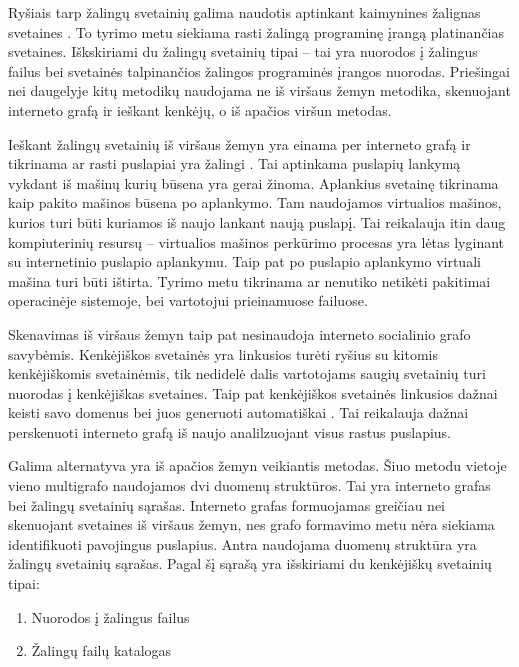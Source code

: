 
Ryšiais tarp žalingų svetainių galima naudotis aptinkant kaimynines žalignas svetaines \cite{webcop}.
To tyrimo metu siekiama rasti žalingą programinę įrangą platinančias svetaines. Iškskiriami du žalingų svetainių tipai --
tai yra nuorodos į žalingus failus bei svetainės talpinančios žalingos programinės įrangos nuorodas.
Priešingai nei daugelyje kitų metodikų naudojama ne iš viršaus žemyn metodika, skenuojant interneto grafą ir ieškant kenkėjų,
o iš apačios viršun metodas.

Ieškant žalingų svetainių iš viršaus žemyn yra einama per interneto grafą ir tikrinama ar rasti puslapiai yra žalingi \cite{webcop}.
Tai aptinkama puslapių lankymą vykdant iš mašinų kurių būsena yra gerai žinoma. Aplankius svetainę tikrinama kaip pakito
mašinos būsena po aplankymo. Tam naudojamos virtualios mašinos, kurios turi būti kuriamos iš naujo lankant naują puslapį.
Tai reikalauja itin daug kompiuterinių resursų -- virtualios mašinos perkūrimo procesas yra lėtas lyginant su
internetinio puslapio aplankymu. Taip pat po puslapio aplankymo virtuali mašina turi būti ištirta. Tyrimo metu tikrinama
ar nenutiko netikėti pakitimai operacinėje sistemoje, bei vartotojui prieinamuose failuose.

Skenavimas iš viršaus žemyn taip pat nesinaudoja interneto socialinio grafo savybėmis. Kenkėjiškos svetainės yra linkusios
turėti ryšius su kitomis kenkėjiškomis svetainėmis, tik nedidelė dalis vartotojams saugių svetainių turi nuorodas į
kenkėjiškas svetaines. Taip pat kenkėjiškos svetainės linkusios dažnai keisti savo domenus \cite{webcop} bei juos
generuoti automatiškai \cite{trees}. Tai reikalauja dažnai perskenuoti interneto grafą iš naujo analilzuojant visus
rastus puslapius.

Galima alternatyva yra iš apačios žemyn veikiantis metodas. Šiuo metodu vietoje vieno multigrafo naudojamos dvi duomenų
struktūros. Tai yra interneto grafas bei žalingų svetainių sąrašas. Interneto grafas formuojamas greičiau nei skenuojant
svetaines iš viršaus žemyn, nes grafo formavimo metu nėra siekiama identifikuoti pavojingus puslapius. Antra naudojama
duomenų struktūra yra žalingų svetainių sąrašas. Pagal šį sąrašą yra išskiriami du kenkėjiškų svetainių tipai:
\begin{enumerate}[label=\alph*]
    \item Nuorodos į žalingus failus
    \item Žalingų failų katalogas
\end{enumerate}


\newpage